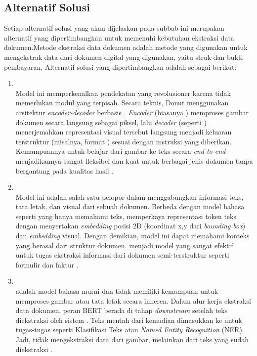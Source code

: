 \subsection{Alternatif Solusi}
\label{subsec:alternatif-solusi}
Setiap alternatif solusi yang akan dijelaskan pada subbab ini merupakan alternatif yang dipertimbangkan untuk memenuhi kebutuhan ekstraksi data dokumen.Metode ekstraksi data dokumen adalah metode yang digunakan untuk mengekstrak data dari dokumen digital yang digunakan, yaitu struk dan bukti pembayaran. Alternatif solusi yang dipertimbangkan adalah sebagai berikut:
\begin{enumerate}
    \item \donut{} ~\\ Model ini memperkenalkan pendekatan yang revolusioner karena tidak memerlukan modul \ocr{} yang terpisah. Secara teknis, Donut menggunakan arsitektur \textit{encoder-decoder} berbasis \transformer. \textit{Encoder} (biasanya \swin) memproses gambar dokumen secara langsung sebagai piksel, lalu \textit{decoder} (seperti \bart) menerjemahkan representasi visual tersebut langsung menjadi keluaran terstruktur (misalnya, format \json) sesuai dengan instruksi yang diberikan. Kemampuannya untuk belajar dari gambar ke teks secara \textit{end-to-end} menjadikannya sangat fleksibel dan kuat untuk berbagai jenis dokumen tanpa bergantung pada kualitas hasil \ocr{} \parencite{kim2021donut}.

    \item \layoutlm ~\\ Model ini adalah salah satu pelopor dalam menggabungkan informasi teks, tata letak, dan visual dari sebuah dokumen. Berbeda dengan model bahasa seperti \bert{} yang hanya memahami teks, \layoutlm{} memperkaya representasi token teks dengan menyertakan \textit{embedding} posisi 2D (koordinat x,y dari \emph{bounding box}) dan \textit{embedding} visual. Dengan demikian, model ini dapat memahami konteks yang berasal dari struktur dokumen. \layoutlm{} menjadi model yang sangat efektif untuk tugas ekstraksi informasi dari dokumen semi-terstruktur seperti formulir dan faktur \parencite{xu2020layoutlm}. 

    \item \bert{} ~\\
    \bert{} adalah model bahasa murni dan tidak memiliki kemampuan untuk memproses gambar atau tata letak secara inheren. Dalam alur kerja ekstraksi data dokumen, peran BERT berada di tahap \textit{downstream} setelah teks diekstraksi oleh sistem \ocr. Teks mentah dari \ocr{} kemudian dimasukkan ke \bert{} untuk tugas-tugas \nlp{} seperti Klasifikasi Teks atau \emph{Named Entity Recognition} (NER). Jadi, \bert{} tidak mengekstraksi data dari gambar, melainkan dari teks yang sudah diekstraksi \parencite{koroteev2021bert}. 


\end{enumerate}

